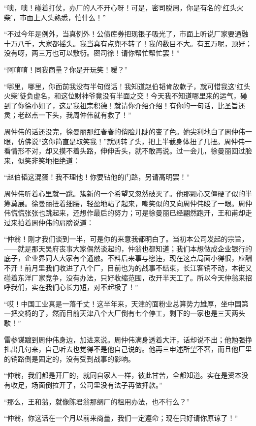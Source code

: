 \par “噢，噢！碰着打仗，办厂的人不开心呀！可是，密司脱周，你是有名的‘红头火柴’，市面上人头熟悉，怕什么！”
\par “不过今年是例外，当真例外！公债库券把现银子吸光了，市面上听说厂家要通融十万八千，大家都摇头。我当真有点兜不转了！我的数目不大。有五万呢，顶好；没有呀，两三万也可以敷衍。密司徐！请你帮忙帮忙罢！”
\par “阿唷唷！同我商量？你是开玩笑！嗳？”
\par “哪里，哪里，你面前我没有半句假话！我知道赵伯韬肯放款子，就可惜我这‘红头火柴’徒负虚名，和这位财神爷竟没有半面之交！今天我不知道哪里来的运气，碰到了你徐小姐了，这是我祖宗积德！就请你介绍介绍！有你的一句话，比圣旨还灵；老赵点一下头，我周仲伟就有救了！”
\par 周仲伟的话还没完，徐曼丽那红春春的俏脸儿陡的变了色。她尖利地白了周仲伟一眼，仿佛说“这你简直是取笑我！”就别转了头，把上半截身体扭了几扭。周仲伟一看情形不对，却又摸不着头路，伸伸舌头，就不敢再说。过一会儿，徐曼丽回过脸来，似笑非笑地拒绝道：
\par “赵伯韬这混蛋！我不理他！你要钻他的门路，另请高明罢！”
\par 周仲伟听着心里就一跳。簇新的一个希望又忽然破灭了。他那颗心又僵硬了似的半筹莫展。徐曼丽扭着细腰，轻盈地站了起来，嘲笑似的又向周仲伟睃了一眼。周仲伟慌慌张张也跳起来，还想作最后的努力；可是徐曼丽已经翩然跑开，王和甫却走过来拍着周仲伟的肩膀说道：
\par “仲翁！刚才我们谈到一半，可是你的来意我都明白了。当初本公司发起的宗旨，——就是那天吴府丧事大家偶然谈起的，仲翁也都知道；我们本想做成企业银行的底子，企业界同人大家有个通融。不料后来事与愿违，现在这点局面小得很，应酬不开！前月里我们收进了八个厂，目前也为的战事不结束，长江客销不动，本街又碰着东洋厂家竞争，没有办法，只好收缩范围，改开半天工了。所以今天仲翁来招呼我们，实在我们心长力短，对不起极了！”
\par “哎！中国工业真是一落千丈！这半年来，天津的面粉业总算势力雄厚，坐中国第一把交椅的了，然而目前天津八个大厂倒有七个停工，剩下的一家也是三天两头歇！”
\par 雷参谋踱到周仲伟身边，加进来说。周仲伟满身透着大汗，话却说不出；他勉强挣扎出几句来，自己听去也觉得不是他自己说的。他再三申述所望不奢，而且他厂里的销路倒是固定的，没有受到战事的影响。
\par “仲翁，我们都是开厂的，就同自家人一样，彼此甘苦，全都知道。实在是资本没有收足，场面倒拉开了，公司里没有法子再做押款。”
\par “那么，王和翁，就像陈君翁那绸厂的租用办法，也不行么？”
\par “仲翁，你这话在一个月以前来商量，我们一定遵命；现在只好请你原谅了！”
